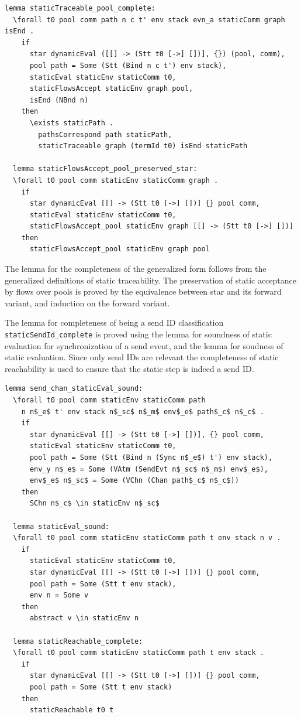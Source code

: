 \documentclass[10pt]{article}
\begin{document}
\begin{lstlisting}[language=logic, mathescape]
  lemma staticTraceable_pool_complete:
  \forall t0 pool comm path n c t' env stack evn_a staticComm graph isEnd .
    if
      star dynamicEval ([[] -> (Stt t0 [->] [])], {}) (pool, comm), 
      pool path = Some (Stt (Bind n c t') env stack), 
      staticEval staticEnv staticComm t0, 
      staticFlowsAccept staticEnv graph pool, 
      isEnd (NBnd n)
    then
      \exists staticPath . 
        pathsCorrespond path staticPath, 
        staticTraceable graph (termId t0) isEnd staticPath

  lemma staticFlowsAccept_pool_preserved_star:
  \forall t0 pool comm staticEnv staticComm graph .
    if
      star dynamicEval [[] -> (Stt t0 [->] [])] {} pool comm, 
      staticEval staticEnv staticComm t0,
      staticFlowsAccept_pool staticEnv graph [[] -> (Stt t0 [->] [])]
    then
      staticFlowsAccept_pool staticEnv graph pool 
\end{lstlisting}


The lemma for the completeness of the generalized form follows from the generalized definitions
of static traceability. The preservation of static acceptance by flows over pools is proved by the
equivalence between star and its forward variant, and induction on the forward variant.

The lemma for completeness of being a send ID classification \lstinline{staticSendId_complete}
is proved using the lemma for
soundness of static evaluation for synchronization of a send event,
and the lemma for soudness of static evaluation.
Since only send IDs are relevant the completeness of static reachability is
used to ensure that the static step is indeed a send ID. 

\begin{lstlisting}[language=logic, mathescape]
  lemma send_chan_staticEval_sound:
  \forall t0 pool comm staticEnv staticComm path
    n n$_e$ t' env stack n$_sc$ n$_m$ env$_e$ path$_c$ n$_c$ .
    if
      star dynamicEval [[] -> (Stt t0 [->] [])], {} pool comm,
      staticEval staticEnv staticComm t0,
      pool path = Some (Stt (Bind n (Sync n$_e$) t') env stack),
      env_y n$_e$ = Some (VAtm (SendEvt n$_sc$ n$_m$) env$_e$),
      env$_e$ n$_sc$ = Some (VChn (Chan path$_c$ n$_c$))
    then
      SChn n$_c$ \in staticEnv n$_sc$

  lemma staticEval_sound:
  \forall t0 pool comm staticEnv staticComm path t env stack n v .
    if
      staticEval staticEnv staticComm t0, 
      star dynamicEval [[] -> (Stt t0 [->] [])] {} pool comm,
      pool path = Some (Stt t env stack), 
      env n = Some v
    then
      abstract v \in staticEnv n 

  lemma staticReachable_complete:
  \forall t0 pool comm staticEnv staticComm path t env stack .
    if
      star dynamicEval [[] -> (Stt t0 [->] [])] {} pool comm,
      pool path = Some (Stt t env stack)
    then
      staticReachable t0 t 
\end{lstlisting}
\end{document}
